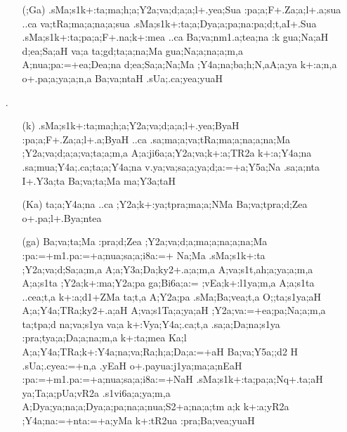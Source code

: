 \begin{spacing}{1.15}
\begin{itemize} 
\item[] \begin{itemize}
       \item[({\sktf ;Ga})] {\sktf .sMa;s1k+:ta;ma;h;a;Y2a;va;d;a;a;l+.yea;Sua
:pa;a;F+.Za;a;l+.a;sua ..ca va;tRa;ma;a;na;a;sua} {\skt
.sMa;s1k+:ta;a;Dya;a;pa;na\ZN{-}:pa;d;t,aI+.Sua .sMa;s1k+:ta;pa;a;F+.na;k+:mea ..ca
Ba;va;nm1.a;tea;na :k gua;Na;aH d;ea;Sa;aH
va;a ta;gd;ta;a;na;Ma gua;Na;a;na;a;m,a A;nua;pa:=+ea;Dea;na
d;ea;Sa;a;Na;Ma ;Y4a;na;ba;h;N,aA;a;ya k+:a;n,a o+.pa;a;ya;a;n,a Ba;va;ntaH .sUa;.ca;yea;yuaH
}
 \end{itemize}
 
 \item[{\sktf 18}.]\begin{itemize}
               \item[({\sktf k})] {\sktf .sMa;s1k+:ta;ma;h;a;Y2a;va;d;a;a;l+.yea;ByaH
:pa;a;F+.Za;a;l+.a;ByaH ..ca .sa;ma;a;va;tRa;ma;a;na;a;na;Ma
;Y2a;va;d;a;a;va;ta;a;m,a A;a:ji6a;a;Y2a;va;k+:a;TR2a k+:a;Y4a;na .sa;mua;Y4a;.ca;ta;a;Y4a;na
v.ya;va;sa;a;ya;d;a:=+a;Y5a;Na .sa;a;nta I+.Y3a;ta
Ba;va;ta;Ma ma;Y3a;taH}
               
       \item[({\sktf Ka})] {\sktf ta;a;Y4a;na ..ca ;Y2a;k+:ya;tpra;ma;a;NMa
Ba;va;tpra;d;Zea o+.pa;l+.Bya;ntea}
 
       \item[({\sktf ga})] {\sktf Ba;va;ta;Ma :pra;d;Zea
;Y2a;va;d;a;ma;a;na;a;na;Ma :pa:=+m1.pa:=+a;nua;sa;a;i8a:=+%
Na;Ma .sMa;s1k+:ta ;Y2a;va;d;Sa;a;m,a
A;a;Y3a;Da;ky2+.a;a;m,a A;va;s1t,ah;a;ya;a;m,a A;a;s1ta ;Y2a;k+:ma;Y2a;pa ga;Bi6a;a:=
;vEa;k+:l1ya;m,a A;a;s1ta ..cea;t,a\ZF{,}
k+:a;d1+ZMa ta;t,a A;Y2a;pa .sMa;Ba;vea;t,a
O;;ta;s1ya;aH A;a;Y4a;TRa;ky2+.a;aH A;va;s1Ta;a;ya;aH
;Y2a;va:=+ea;pa;Na;a;m,a\ZF{,} ta;tpa;d na;va;s1ya va;a k+:Vya;Y4a;.ca;t,a .sa;a;Da;na;s1ya
:pra;tya;a;Da;a;na;m,a k+:ta;mea Ka;l
A;a;Y4a;TRa;k+:Y4a;na;va;Ra;h;a;Da;a:=+aH Ba;va;Y5a;;d2%
H .sUa;.cyea:=+n,a\ZF{,} .yEaH o+.payua:j1ya;ma;a;nEaH :pa:=+m1.pa:=+a;nua;sa;a;i8a:=+NaH
.sMa;s1k+:ta;pa;a;Nq+.ta;aH
ya;Ta;a;pUa;vR2a .s1vi6a;a;ya;m,a A;Dya;ya;na;a;Dya;a;pa;na;a;nua;S2+a;na;a;tm%
a;k k+:a;yR2a ;Y4a;na:=+nta:=+a;yMa k+:tR2ua :pra;Ba;vea;yuaH } 
     

\end{itemize}
\end{itemize}
\end{spacing}
